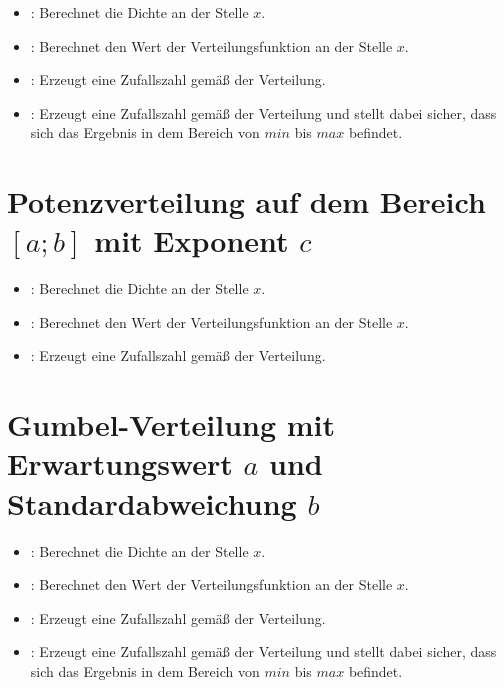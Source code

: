\begin{itemize}

\item
{}:
Berechnet die Dichte an der Stelle $x$.

\item
{}:
Berechnet den Wert der Verteilungsfunktion an der Stelle $x$.

\item
{}:
Erzeugt eine Zufallszahl gemäß der Verteilung.

\item
{}:
Erzeugt eine Zufallszahl gemäß der Verteilung und stellt dabei sicher, dass sich das Ergebnis in dem Bereich von $min$ bis $max$ befindet.

\end{itemize}



\section{Potenzverteilung auf dem Bereich \texorpdfstring{$[a;b]$}{[a;b]} mit Exponent \texorpdfstring{$c$}{c}}

\begin{itemize}

\item
{}:
Berechnet die Dichte an der Stelle $x$.

\item
{}:
Berechnet den Wert der Verteilungsfunktion an der Stelle $x$.

\item
{}:
Erzeugt eine Zufallszahl gemäß der Verteilung.

\end{itemize}



\section{Gumbel-Verteilung mit Erwartungswert \texorpdfstring{$a$}{a} und Standardabweichung \texorpdfstring{$b$}{b}}

\begin{itemize}

\item
{}:
Berechnet die Dichte an der Stelle $x$.

\item
{}:
Berechnet den Wert der Verteilungsfunktion an der Stelle $x$.

\item
{}:
Erzeugt eine Zufallszahl gemäß der Verteilung.

\item
{}:
Erzeugt eine Zufallszahl gemäß der Verteilung und stellt dabei sicher, dass sich das Ergebnis in dem Bereich von $min$ bis $max$ befindet.

\end{itemize}



